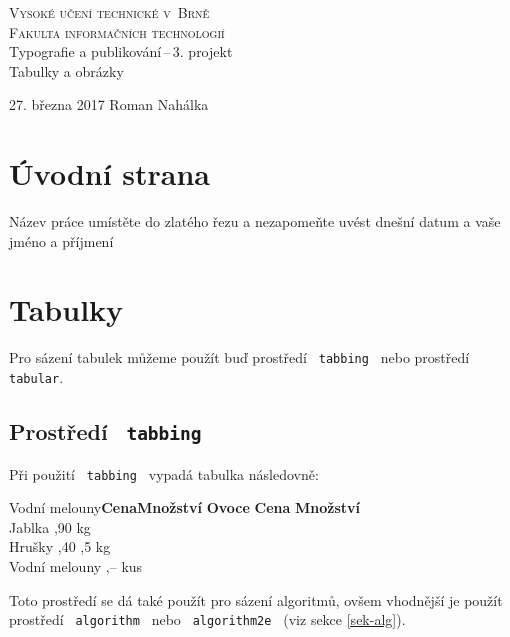 \documentclass[a4paper, 11pt, ]{article}
\begin{document}
\begin{titlepage}
\begin{center}
{\Huge \textsc{Vysoké učení technické v~Brně}\\ \huge \textsc{Fakulta informačních technologií\\}}
{\LARGE Typografie a publikování\,--\,3. projekt\\ \Huge Tabulky a obrázky}
\end{center}
{\Large 27. března 2017 \hfill Roman Nahálka}
\end{titlepage}
\section{Úvodní strana}
Název práce umístěte do zlatého řezu a nezapomeňte uvést dnešní datum a vaše jméno a příjmení

\section{Tabulky}
Pro sázení tabulek můžeme použít buď prostředí \texttt{ tabbing } nebo prostředí \texttt{ tabular}.

\subsection{Prostředí \texttt{ tabbing }}
Při použití \texttt{ tabbing } vypadá tabulka následovně:
\begin{tabbing}
Vodní melouny\quad \= \textbf{Cena}\quad \= \textbf{Množství} \kill
\textbf{Ovoce} \> \textbf{Cena} \> \textbf{Množství} \\
Jablka ,90  kg \\
Hrušky ,40 ,5 kg \\
Vodní melouny ,--  kus \\
\end{tabbing}
Toto prostředí se dá také použít pro sázení algoritmů, ovšem vhodnější je použít 
prostředí \texttt{ algorithm } nebo \texttt{ algorithm2e } (viz sekce \ref{sek-alg}).
\end{document}

